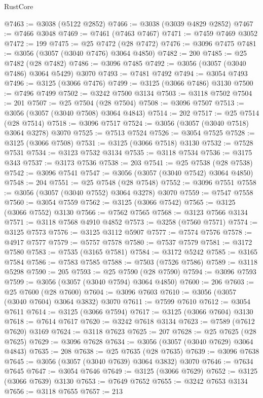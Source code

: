 \begin{lexlean}{RustCore}
\begin{coremodule}
@7463 := @3038 (@5122 @2852)
@7466 := @3038 (@3039 @4829 @2852)
@7467 := @7466 @3048
@7469 := @7461 (@7463 @7467)
@7471 := @7459 @7469 @3052
@7472 := 199
@7475 := @25 @7472 (@28 @7472)
@7476 := @3096 @7475
@7481 := @3056 (@3057 (@3040 @7476) @3064 @4850)
@7482 := 200
@7485 := @25 @7482 (@28 @7482)
@7486 := @3096 @7485
@7492 := @3056 (@3057 (@3040 @7486) @3064 @5429) @3070
@7493 := @7481 @7492
@7494 := @3054 @7493
@7496 := @3125 (@3066 @7476)
@7499 := @3125 (@3066 @7486) @3130
@7500 := @7496 @7499
@7502 := @3242 @7500 @3134
@7503 := @3118 @7502
@7504 := 201
@7507 := @25 @7504 (@28 @7504)
@7508 := @3096 @7507
@7513 := @3056 (@3057 (@3040 @7508) @3064 @4843)
@7514 := 202
@7517 := @25 @7514 (@28 @7514)
@7518 := @3096 @7517
@7524 := @3056 (@3057 (@3040 @7518) @3064 @3278) @3070
@7525 := @7513 @7524
@7526 := @3054 @7525
@7528 := @3125 (@3066 @7508)
@7531 := @3125 (@3066 @7518) @3130
@7532 := @7528 @7531
@7534 := @3123 @7532 @3134
@7535 := @3118 @7534
@7536 := @3175 @343
@7537 := @3173 @7536
@7538 := 203
@7541 := @25 @7538 (@28 @7538)
@7542 := @3096 @7541
@7547 := @3056 (@3057 (@3040 @7542) @3064 @4850)
@7548 := 204
@7551 := @25 @7548 (@28 @7548)
@7552 := @3096 @7551
@7558 := @3056 (@3057 (@3040 @7552) @3064 @3278) @3070
@7559 := @7547 @7558
@7560 := @3054 @7559
@7562 := @3125 (@3066 @7542)
@7565 := @3125 (@3066 @7552) @3130
@7566 := @7562 @7565
@7568 := @3123 @7566 @3134
@7571 := @3118 @7568 @4910 @4852
@7573 := @3258 (@7560 @7571)
@7574 := @3125 @7573
@7576 := @3125 @3112 @5907
@7577 := @7574 @7576
@7578 := @4917 @7577
@7579 := @5757 @7578
@7580 := @7537 @7579
@7581 := @3172 @7580
@7583 := @7535 (@3165 @7581)
@7584 := @3172 @5242
@7585 := @3165 @7584
@7586 := @7583 @7585
@7588 := @7503 (@7526 @7586)
@7589 := @3118 @5298
@7590 := 205
@7593 := @25 @7590 (@28 @7590)
@7594 := @3096 @7593
@7599 := @3056 (@3057 (@3040 @7594) @3064 @4850)
@7600 := 206
@7603 := @25 @7600 (@28 @7600)
@7604 := @3096 @7603
@7610 := @3056 (@3057 (@3040 @7604) @3064 @3832) @3070
@7611 := @7599 @7610
@7612 := @3054 @7611
@7614 := @3125 (@3066 @7594)
@7617 := @3125 (@3066 @7604) @3130
@7618 := @7614 @7617
@7620 := @3242 @7618 @3134
@7623 := @7589 (@7612 @7620) @3169
@7624 := @3118 @7623
@7625 := 207
@7628 := @25 @7625 (@28 @7625)
@7629 := @3096 @7628
@7634 := @3056 (@3057 (@3040 @7629) @3064 @4843)
@7635 := 208
@7638 := @25 @7635 (@28 @7635)
@7639 := @3096 @7638
@7645 := @3056 (@3057 (@3040 @7639) @3064 @3832) @3070
@7646 := @7634 @7645
@7647 := @3054 @7646
@7649 := @3125 (@3066 @7629)
@7652 := @3125 (@3066 @7639) @3130
@7653 := @7649 @7652
@7655 := @3242 @7653 @3134
@7656 := @3118 @7655
@7657 := 213

\end{coremodule}
\end{lexlean}
